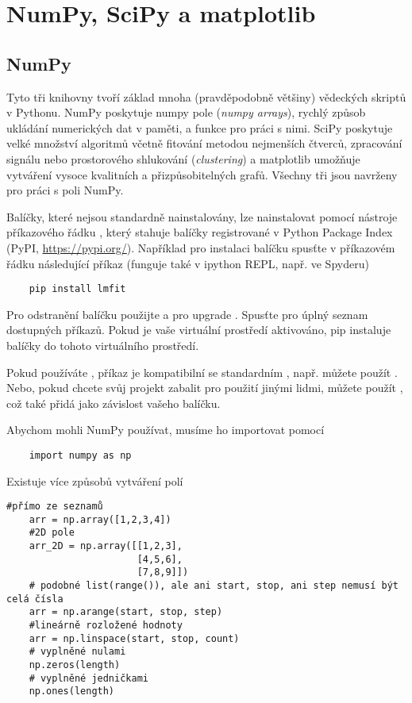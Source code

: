 \newpage
\section{NumPy, SciPy a matplotlib}
\subsection{NumPy}
Tyto tři knihovny tvoří základ mnoha (pravděpodobně většiny) vědeckých skriptů v Pythonu. NumPy poskytuje numpy pole (\emph{numpy arrays}), rychlý způsob ukládání numerických dat v paměti, a funkce pro práci s nimi. SciPy poskytuje velké množství algoritmů včetně fitování metodou nejmenších čtverců, zpracování signálu nebo prostorového shlukování (\emph{clustering}) a matplotlib umožňuje vytváření vysoce kvalitních a přizpůsobitelných grafů. Všechny tři jsou navrženy pro práci s poli NumPy.

\begin{syntax}
    Balíčky, které nejsou standardně nainstalovány, lze nainstalovat pomocí nástroje příkazového řádku , který stahuje balíčky registrované v Python Package Index (PyPI, \url{https://pypi.org/}). Například pro instalaci balíčku  spusťte v příkazovém řádku následující příkaz (funguje také v ipython REPL, např. ve Spyderu)
\begin{lstlisting}
    pip install lmfit 
\end{lstlisting}
    Pro odstranění balíčku použijte  a pro upgrade . Spusťte  pro úplný seznam dostupných příkazů. Pokud je vaše virtuální prostředí aktivováno, pip instaluje balíčky do tohoto virtuálního prostředí.

    Pokud používáte , příkaz  je kompatibilní se standardním , např. můžete použít . Nebo, pokud chcete svůj projekt zabalit pro použití jinými lidmi, můžete použít , což také přidá  jako závislost vašeho balíčku.
\end{syntax}

Abychom mohli NumPy používat, musíme ho importovat pomocí
\begin{lstlisting}
    import numpy as np
\end{lstlisting}
Existuje více způsobů vytváření polí
\begin{lstlisting}[caption=Tvorba polí.]
    #přímo ze seznamů
    arr = np.array([1,2,3,4])
    #2D pole
    arr_2D = np.array([[1,2,3],
                       [4,5,6],
                       [7,8,9]])
    # podobné list(range()), ale ani start, stop, ani step nemusí být celá čísla
    arr = np.arange(start, stop, step)
    #lineárně rozložené hodnoty
    arr = np.linspace(start, stop, count)
    # vyplněné nulami
    np.zeros(length)
    # vyplněné jedničkami
    np.ones(length)
\end{lstlisting}

